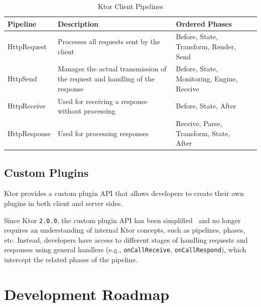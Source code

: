 \begin{table}[!htb]
    \centering
    \caption{Ktor Client Pipelines}
    \label{tab:ktor-client-pipelines}
    \vspace{0.3cm}
    \begin{tabular}{|l|p{6cm}|p{5cm}|p{5cm}|}
        \hline
        \textbf{Pipeline} & \textbf{Description}                                                        & \textbf{Ordered Phases}                    \\ \hline
        HttpRequest       & Processes all requests sent by the client                                   & Before, State, Transform, Render, Send     \\ \hline
        HttpSend          & Manages the actual transmission of the request and handling of the response & Before, State, Monitoring, Engine, Receive \\ \hline
        HttpReceive       & Used for receiving a response without processing                            & Before, State, After                       \\ \hline
        HttpResponse      & Used for processing responses                                               & Receive, Parse, Transform, State, After    \\ \hline
    \end{tabular}
\end{table}

\subsection{Custom Plugins}\label{subsec:custom-plugins}

Ktor provides a custom plugin API that allows developers to create their own plugins in both client and server sides.

Since Ktor \texttt{2.0.0}, the custom plugin API has been simplified~\cite{ktor-server-custom-plugins, ktor-client-custom-plugins} and no longer requires an understanding of internal Ktor concepts, such as pipelines, phases, etc.
Instead, developers have access to different stages of handling requests and responses using general handlers (e.g., \texttt{onCallReceive}, \texttt{onCallRespond}), which intercept the related phases of the pipeline.


\section{Development Roadmap}\label{sec:development-roadmap}


